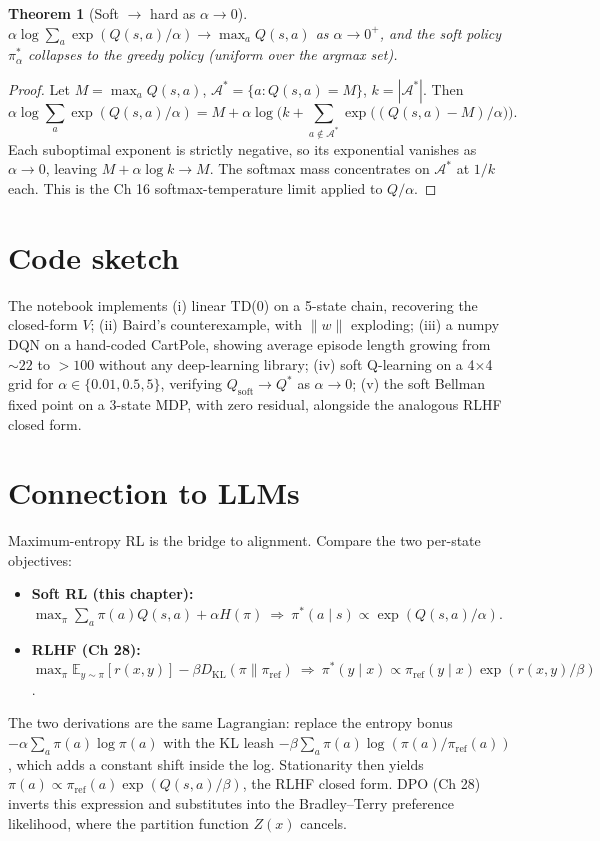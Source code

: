 \documentclass[11pt]{article}
\newtheorem{theorem}{Theorem}[section]
\theoremstyle{remark}
\begin{document}
\begin{theorem}[Soft $\to$ hard as $\alpha\to 0$]
$\alpha\log\sum_a\exp(Q(s,a)/\alpha)\to\max_a Q(s,a)$ as $\alpha\to 0^+$, and the soft policy $\pi^*_\alpha$ collapses to the greedy policy (uniform over the argmax set).
\end{theorem}

\begin{proof}
Let $M=\max_a Q(s,a)$, $\mathcal{A}^*=\{a:Q(s,a)=M\}$, $k=|\mathcal{A}^*|$. Then
\[
\alpha\log\sum_a\exp(Q(s,a)/\alpha)=M+\alpha\log\!\Big(k+\sum_{a\notin\mathcal{A}^*}\exp\!\big((Q(s,a)-M)/\alpha\big)\Big).
\]
Each suboptimal exponent is strictly negative, so its exponential vanishes as $\alpha\to 0$, leaving $M+\alpha\log k\to M$. The softmax mass concentrates on $\mathcal{A}^*$ at $1/k$ each. This is the Ch 16 softmax-temperature limit applied to $Q/\alpha$.
\end{proof}

\section*{Code sketch}

The notebook implements (i) linear TD(0) on a 5-state chain, recovering the closed-form $V$; (ii) Baird's counterexample, with $\|w\|$ exploding; (iii) a numpy DQN on a hand-coded CartPole, showing average episode length growing from $\sim 22$ to $>100$ without any deep-learning library; (iv) soft Q-learning on a 4$\times$4 grid for $\alpha\in\{0.01,0.5,5\}$, verifying $Q_{\mathrm{soft}}\to Q^*$ as $\alpha\to 0$; (v) the soft Bellman fixed point on a 3-state MDP, with zero residual, alongside the analogous RLHF closed form.

\section*{Connection to LLMs}

Maximum-entropy RL is the bridge to alignment. Compare the two per-state objectives:
\begin{itemize}
\item \textbf{Soft RL (this chapter):} $\max_\pi\sum_a\pi(a)Q(s,a)+\alpha H(\pi)\ \Rightarrow\ \pi^*(a\mid s)\propto\exp(Q(s,a)/\alpha)$.
\item \textbf{RLHF (Ch 28):} $\max_\pi\mathbb{E}_{y\sim\pi}[r(x,y)]-\beta D_{\mathrm{KL}}(\pi\|\pi_{\mathrm{ref}})\ \Rightarrow\ \pi^*(y\mid x)\propto\pi_{\mathrm{ref}}(y\mid x)\exp(r(x,y)/\beta)$.
\end{itemize}
The two derivations are the same Lagrangian: replace the entropy bonus $-\alpha\sum_a\pi(a)\log\pi(a)$ with the KL leash $-\beta\sum_a\pi(a)\log(\pi(a)/\pi_{\mathrm{ref}}(a))$, which adds a constant shift inside the log. Stationarity then yields $\pi(a)\propto\pi_{\mathrm{ref}}(a)\exp(Q(s,a)/\beta)$, the RLHF closed form. DPO (Ch 28) inverts this expression and substitutes into the Bradley--Terry preference likelihood, where the partition function $Z(x)$ cancels.
\end{document}
